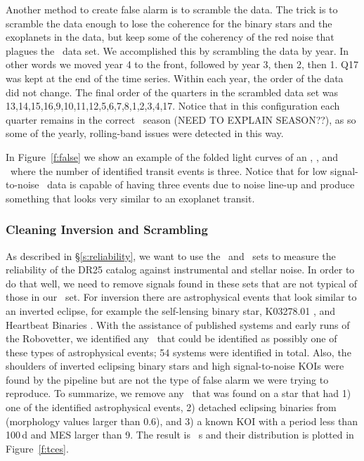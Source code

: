 Another method to create false alarm is to scramble the data.  The trick is to scramble the data enough to lose the coherence for the binary stars and the exoplanets in the data, but keep some of the coherency of the red noise that plagues the \Kepler\ data set.  We accomplished this by scrambling the data by year. In other words we moved year 4 to the front, followed by year 3, then 2, then 1. Q17 was kept at the end of the time series. Within each year, the order of the data did not change. The final order of the quarters in the scrambled data set was 13,14,15,16,9,10,11,12,5,6,7,8,1,2,3,4,17.  Notice that in this configuration each quarter remains in the correct \Kepler\ season (NEED TO EXPLAIN SEASON??), as so some of the yearly, rolling-band issues were detected in this way.



In Figure~\ref{f:false} we show an example of the folded light curves of an \opstce, \invtce, and \scrtce\ where the number of identified transit events is three.  Notice that for low signal-to-noise \Kepler\ data is capable of having three events due to noise line-up and produce something that looks very similar to an exoplanet transit.  

\subsubsection{Cleaning Inversion and Scrambling}
As described in \S\ref{s:reliability}, we want to use the \invtce\ and \scrtce\ sets to measure the reliability of the DR25 catalog against instrumental and stellar noise.  In order to do that well, we need to remove signals found in these sets that are not typical of those in our \opstce\ set.  For inversion there are astrophysical events that look similar to an inverted eclipse, for example the self-lensing binary star, K03278.01 \citep{Kruse2014}, and Heartbeat Binaries \citep{Thompson2012}.  With the assistance of published systems and early runs of the Robovetter, we identified any \invtce\ that could be identified as possibly one of these types of astrophysical events; 54 systems were identified in total.  Also, the shoulders of inverted eclipsing binary stars and high signal-to-noise KOIs were found by the pipeline but are not the type of false alarm we were trying to reproduce.  To summarize, we remove any \invtce\ that was found on a star that had 1) one of the identified astrophysical events, 2) detached eclipsing binaries from \citet{Kirk2016} (morphology values larger than 0.6), and 3) a known KOI with a period less than 100\,d and MES larger than 9.  The result is \ninvtces\ \invtce s and their distribution is plotted in Figure~\ref{f:tces}.

